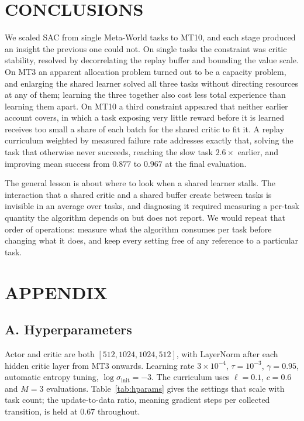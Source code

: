 \documentclass[letterpaper, 10 pt, conference]{ieeeconf}
\begin{document}
\section{CONCLUSIONS}

We scaled SAC from single Meta-World tasks to MT10, and each stage produced an insight
the previous one could not. On single tasks the constraint was critic stability, resolved by
decorrelating the replay buffer and bounding the value scale. On MT3 an apparent allocation
problem turned out to be a capacity problem, and enlarging the shared learner solved all three
tasks without directing resources at any of them; learning the three together also cost less
total experience than learning them apart. On MT10 a third constraint appeared that neither
earlier account covers, in which a task exposing very little reward before it is learned
receives too small a share of each batch for the shared critic to fit it. A replay curriculum
weighted by measured failure rate addresses exactly that, solving the task that otherwise never
succeeds, reaching the slow task $2.6\times$ earlier, and improving mean success from $0.877$
to $0.967$ at the final evaluation.

The general lesson is about where to look when a shared learner stalls. The interaction
that a shared critic and a shared buffer create between tasks is invisible in an average over
tasks, and diagnosing it required measuring a per-task quantity the algorithm depends on but
does not report. We would repeat that order of operations: measure what the algorithm consumes
per task before changing what it does, and keep every setting free of any reference to a
particular task.

\section*{APPENDIX}

\subsection*{A. Hyperparameters}

Actor and critic are both $[512, 1024, 1024, 512]$, with LayerNorm after each hidden critic
layer from MT3 onwards. Learning rate $3\times10^{-4}$, $\tau = 10^{-3}$, $\gamma = 0.95$,
automatic entropy tuning, $\log\sigma_{\text{init}} = -3$. The curriculum uses $\ell = 0.1$,
$c = 0.6$ and $M = 3$ evaluations. Table~\ref{tab:hparams} gives the settings that scale
with task count; the update-to-data ratio, meaning gradient steps per collected transition, is
held at $0.67$ throughout.
\end{document}
